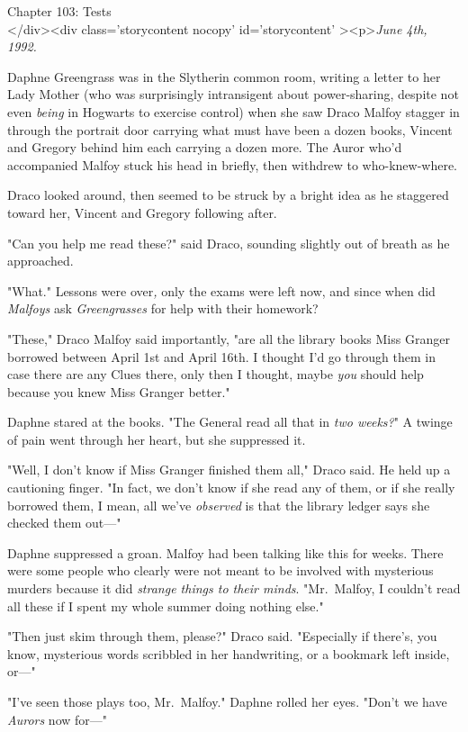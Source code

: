 
Chapter 103: Tests\\
</div><div  class='storycontent nocopy' id='storycontent' ><p>\emph{June 4th, 1992.}

Daphne Greengrass was in the Slytherin common room, writing a letter to her Lady Mother (who was surprisingly intransigent about power-sharing, despite not even \emph{being} in Hogwarts to exercise control) when she saw Draco Malfoy stagger in through the portrait door carrying what must have been a dozen books, Vincent and Gregory behind him each carrying a dozen more. The Auror who'd accompanied Malfoy stuck his head in briefly, then withdrew to who-knew-where.

Draco looked around, then seemed to be struck by a bright idea as he staggered toward her, Vincent and Gregory following after.

"Can you help me read these?" said Draco, sounding slightly out of breath as he approached.

"What." Lessons were over\emph{,} only the exams were left now, and since when did \emph{Malfoys} ask \emph{Greengrasses} for help with their homework?

"These," Draco Malfoy said importantly, "are all the library books Miss Granger borrowed between April 1st and April 16th. I thought I'd go through them in case there are any Clues there, only then I thought, maybe \emph{you} should help because you knew Miss Granger better."

Daphne stared at the books. "The General read all that in \emph{two weeks?}" A twinge of pain went through her heart, but she suppressed it.

"Well, I don't know if Miss Granger finished them all," Draco said. He held up a cautioning finger. "In fact, we don't know if she read any of them, or if she really borrowed them, I mean, all we've \emph{observed} is that the library ledger says she checked them out---"

Daphne suppressed a groan. Malfoy had been talking like this for weeks. There were some people who clearly were not meant to be involved with mysterious murders because it did \emph{strange things to their minds}. "Mr.~Malfoy, I couldn't read all these if I spent my whole summer doing nothing else."

"Then just skim through them, please?" Draco said. "Especially if there's, you know, mysterious words scribbled in her handwriting, or a bookmark left inside, or---"

"I've seen those plays too, Mr.~Malfoy." Daphne rolled her eyes. "Don't we have \emph{Aurors} now for---"

